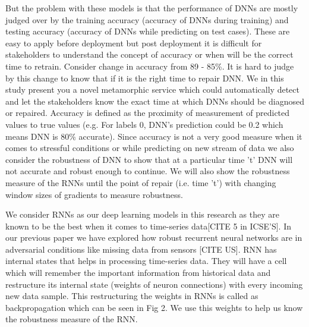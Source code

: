 \documentclass[sigconf,authordraft]{acmart}
\begin{document}
But the problem with these models is that the performance of DNNs are mostly judged over by the training accuracy (accuracy of DNNs during training) and testing accuracy (accuracy of DNNs while predicting on test cases). These are easy to apply before deployment but post deployment it is difficult for stakeholders to understand the concept of accuracy or when will be the correct time to retrain. Consider change in accuracy from 89 - 85\%. It is hard to judge by this change to know that if it is the right time to repair DNN. We in this study present you a novel metamorphic service which could automatically detect and let the stakeholders know the exact time at which DNNs should be diagnosed or repaired. Accuracy is defined as the proximity of measurement of predicted values to true values (e.g. For labels 0, DNN's prediction could be 0.2 which means DNN is 80\% accurate). Since accuracy is not a very good measure when it comes to stressful conditions or while predicting on new stream of data we also consider the robustness of DNN to show that at a particular time 't' DNN will not accurate and robust enough to continue. We will also show the robustness measure of the RNNs until the point of repair (i.e. time 't') with changing window sizes of gradients to measure robustness.%
 

 
We consider RNNs as our deep learning models in this research as they are known to be the best when it comes to time-series data[CITE 5 in ICSE'S]. In our previous paper we have explored how robust recurrent neural networks are in adversarial conditions like missing data from sensors [CITE US]. RNN has internal states that helps in processing time-series data. They will have a cell which will remember the important information from historical data and restructure its internal state (weights of neuron connections) with every incoming new data sample. This restructuring the weights in RNNs is called as backpropagation which can be seen in Fig 2. We use this weights to help us know the robustness measure of the RNN. %
\end{document}
